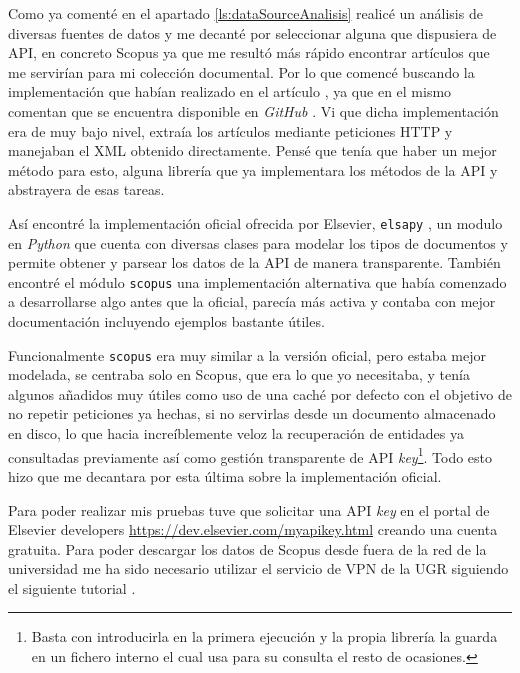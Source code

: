 Como ya comenté en el apartado \ref{ls:dataSourceAnalisis} realicé un análisis de diversas fuentes de datos y me decanté por seleccionar alguna que dispusiera de \acrshort{API}, en concreto Scopus ya que me resultó más rápido encontrar artículos que me servirían para mi colección documental. Por lo que comencé buscando la implementación que habían realizado en el artículo \cite{DBLP:conf/ecir/SarolLS18}, ya que en el mismo comentan que se encuentra disponible en \textit{GitHub} \cite{bir_scopus_gh}. Vi que dicha implementación era de muy bajo nivel, extraía los artículos mediante peticiones \acrshort{HTTP} y manejaban el \acrshort{XML} obtenido directamente. Pensé que tenía que haber un mejor método para esto, alguna librería que ya implementara los métodos de la \acrshort{API} y abstrayera de esas tareas. 

Así encontré la implementación oficial ofrecida por Elsevier, \texttt{elsapy} \cite{elsapy}, un modulo en \textit{Python} que cuenta con diversas clases para modelar los tipos de documentos y permite obtener y parsear los datos de la \acrshort{API} de manera transparente. También encontré el módulo \texttt{scopus} \cite{scopus-api} una implementación alternativa que había comenzado a desarrollarse algo antes que la oficial, parecía más activa y contaba con mejor documentación incluyendo ejemplos bastante útiles. 

Funcionalmente \texttt{scopus} era muy similar a la versión oficial, pero estaba mejor modelada, se centraba solo en Scopus, que era lo que yo necesitaba, y tenía algunos añadidos muy útiles como uso de una caché por defecto con el objetivo de no repetir peticiones ya hechas, si no servirlas desde un documento almacenado en disco, lo que hacia increíblemente veloz la recuperación de entidades ya consultadas previamente así como gestión transparente de \acrshort{API} \textit{key}\footnote[3]{Basta con introducirla en la primera ejecución y la propia librería la guarda en un fichero interno el cual usa para su consulta el resto de ocasiones.}. Todo esto hizo que me decantara por esta última sobre la implementación oficial.

Para poder realizar mis pruebas tuve que solicitar una \acrshort{API} \textit{key} en el portal de Elsevier developers \url{https://dev.elsevier.com/myapikey.html} creando una cuenta gratuita. Para poder descargar los datos de Scopus desde fuera de la red de la universidad me ha sido necesario utilizar el servicio de \acrshort{VPN} de la \acrshort{UGR} siguiendo el siguiente tutorial \cite{vpnUGR}.

